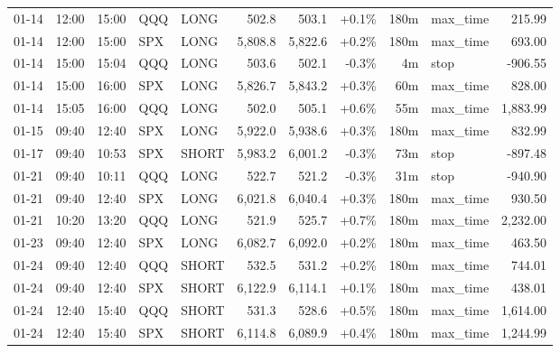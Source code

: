 \documentclass[11pt,a4paper,twoside]{article}
\begin{document}
\begin{center}
\begin{longtable}{>{\color{txtmain}}l l l l l r r r r >{\color{txtmain}}l r}
01-14 & 12:00 & 15:00 & QQQ & LONG & 502.8 & 503.1 & \textcolor{wingreen}{+0.1\%} & 180m & max\_time & \textcolor{wingreen}{215.99} \\
01-14 & 12:00 & 15:00 & SPX & LONG & 5,808.8 & 5,822.6 & \textcolor{wingreen}{+0.2\%} & 180m & max\_time & \textcolor{wingreen}{693.00} \\
01-14 & 15:00 & 15:04 & QQQ & LONG & 503.6 & 502.1 & \textcolor{lossred}{-0.3\%} & 4m & stop & \textcolor{lossred}{-906.55} \\
01-14 & 15:00 & 16:00 & SPX & LONG & 5,826.7 & 5,843.2 & \textcolor{wingreen}{+0.3\%} & 60m & max\_time & \textcolor{wingreen}{828.00} \\
01-14 & 15:05 & 16:00 & QQQ & LONG & 502.0 & 505.1 & \textcolor{wingreen}{+0.6\%} & 55m & max\_time & \textcolor{wingreen}{1,883.99} \\
01-15 & 09:40 & 12:40 & SPX & LONG & 5,922.0 & 5,938.6 & \textcolor{wingreen}{+0.3\%} & 180m & max\_time & \textcolor{wingreen}{832.99} \\
01-17 & 09:40 & 10:53 & SPX & SHORT & 5,983.2 & 6,001.2 & \textcolor{lossred}{-0.3\%} & 73m & stop & \textcolor{lossred}{-897.48} \\
01-21 & 09:40 & 10:11 & QQQ & LONG & 522.7 & 521.2 & \textcolor{lossred}{-0.3\%} & 31m & stop & \textcolor{lossred}{-940.90} \\
01-21 & 09:40 & 12:40 & SPX & LONG & 6,021.8 & 6,040.4 & \textcolor{wingreen}{+0.3\%} & 180m & max\_time & \textcolor{wingreen}{930.50} \\
01-21 & 10:20 & 13:20 & QQQ & LONG & 521.9 & 525.7 & \textcolor{wingreen}{+0.7\%} & 180m & max\_time & \textcolor{wingreen}{2,232.00} \\
01-23 & 09:40 & 12:40 & SPX & LONG & 6,082.7 & 6,092.0 & \textcolor{wingreen}{+0.2\%} & 180m & max\_time & \textcolor{wingreen}{463.50} \\
01-24 & 09:40 & 12:40 & QQQ & SHORT & 532.5 & 531.2 & \textcolor{wingreen}{+0.2\%} & 180m & max\_time & \textcolor{wingreen}{744.01} \\
01-24 & 09:40 & 12:40 & SPX & SHORT & 6,122.9 & 6,114.1 & \textcolor{wingreen}{+0.1\%} & 180m & max\_time & \textcolor{wingreen}{438.01} \\
01-24 & 12:40 & 15:40 & QQQ & SHORT & 531.3 & 528.6 & \textcolor{wingreen}{+0.5\%} & 180m & max\_time & \textcolor{wingreen}{1,614.00} \\
01-24 & 12:40 & 15:40 & SPX & SHORT & 6,114.8 & 6,089.9 & \textcolor{wingreen}{+0.4\%} & 180m & max\_time & \textcolor{wingreen}{1,244.99} \\

\end{longtable}
\end{center}
\end{document}
